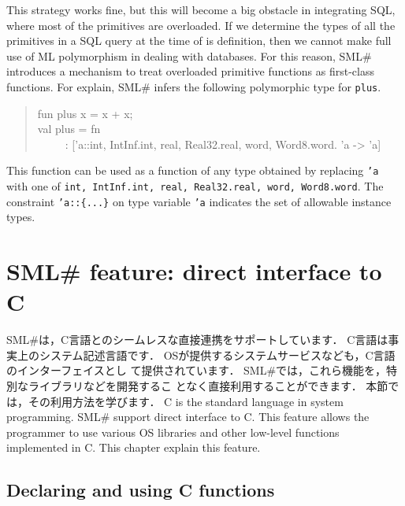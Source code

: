 \documentclass{jbook}
\newcommand{\txt}[2]{#2}
\newcommand{\smlsharp}{SML\#}
\newcommand{\myem}{\ \ \ \ \  }
\begin{document}
	This strategy works fine, but this will become a big obstacle in
integrating SQL, where most of the primitives are overloaded.
	If we determine the types of all the primitives in a SQL query
at the time of is definition, then we cannot make full use of ML
polymorphism in dealing with databases.
	For this reason, \smlsharp{} introduces a mechanism to treat
overloaded primitive functions as first-class functions.
	For explain, \smlsharp{} infers the following polymorphic type
for {\tt plus}.
\begin{quote}
fun plus x = x + x;\\
val plus = fn\\
\myem  : ['a::{int, IntInf.int, real, Real32.real, word, Word8.word}. 'a -> 'a]
\end{quote}
	This function can be used as a function of any type obtained by
replacing {\tt 'a} with one of {\tt int, IntInf.int, real,
Real32.real, word, Word8.word}.
	The constraint {\tt 'a::\{...\}} on type variable {\tt 'a}
indicates the set of allowable instance types.
\fi%


\chapter{
\txt{\smlsharp{}の拡張機能：Cとの直接連携}
    {\smlsharp{} feature: direct interface to C}
}
\label{chap:tutorialCFFI}

\ifx\jp%
	\smlsharp{}は，C言語とのシームレスな直接連携をサポートしています．
	C言語は事実上のシステム記述言語です．
	OSが提供するシステムサービスなども，C言語のインターフェイスとし
て提供されています．
	\smlsharp{}では，これら機能を，特別なライブラリなどを開発するこ
となく直接利用することができます．
	本節では，その利用方法を学びます．
\else%
	C is the standard language in system programming.
	\smlsharp{} support direct interface to C.
	This feature allows the programmer to use various OS libraries
and other low-level functions implemented in C.
	This chapter explain this feature.
\fi%

\section{\txt{C関数の使用の宣言}{Declaring and using C functions}}
\label{sec:extensionCdecl}
\end{document}
